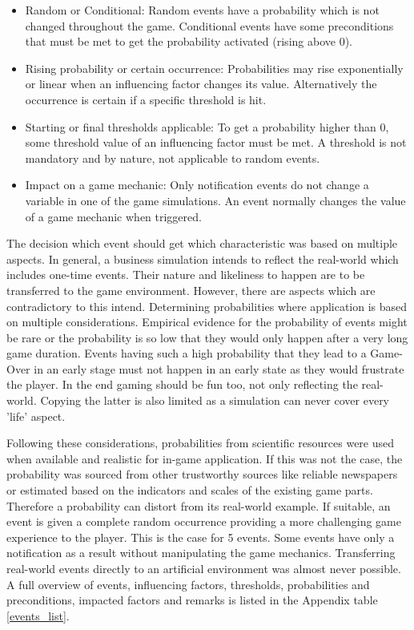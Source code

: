 \documentclass[11pt,titlepage,oneside,openany]{book}
\begin{document}
\begin{itemize}
\item Random or Conditional: Random events have a probability which is not changed throughout the game. Conditional events have some preconditions that must be met to get the probability activated (rising above 0).
\item Rising probability or certain occurrence: Probabilities may rise exponentially or linear when an influencing factor changes its value. Alternatively the occurrence is certain if a specific threshold is hit.
\item Starting or final thresholds applicable: To get a probability higher than 0, some threshold value of an influencing factor must be met. A threshold is not mandatory and by nature, not applicable to random events.
\item Impact on a game mechanic: Only notification events do not change a variable in one of the game simulations. An event normally changes the value of a game mechanic when triggered.
\end{itemize}

The decision which event should get which characteristic was based on multiple aspects. In general, a business simulation intends to reflect the real-world which includes one-time events. Their nature and likeliness to happen are to be transferred to the game environment. However, there are aspects which are contradictory to this intend.
Determining probabilities where application is based on multiple considerations. Empirical evidence for the probability of events might be rare or the probability is so low that they would only happen after a very long game duration. Events having such a high probability that they lead to a Game-Over in an early stage must not happen in an early state as they would frustrate the player. In the end gaming should be fun too, not only reflecting the real-world. Copying the latter is also limited as a simulation can never cover every 'life' aspect. 

Following these considerations, probabilities from scientific resources were used when available and realistic for in-game application. If this was not the case, the probability was sourced from other trustworthy sources like reliable newspapers or estimated based on the indicators and scales of the existing game parts. Therefore a probability can distort from its real-world example. If suitable, an event is given a complete random occurrence providing a more challenging game experience to the player. This is the case for 5 events. Some events have only a notification as a result without manipulating the game mechanics. Transferring real-world events directly to an artificial environment was almost never possible. A full overview of events, influencing factors, thresholds, probabilities and preconditions, impacted factors and remarks is listed in the Appendix table \ref{events_list}. 
\end{document}
